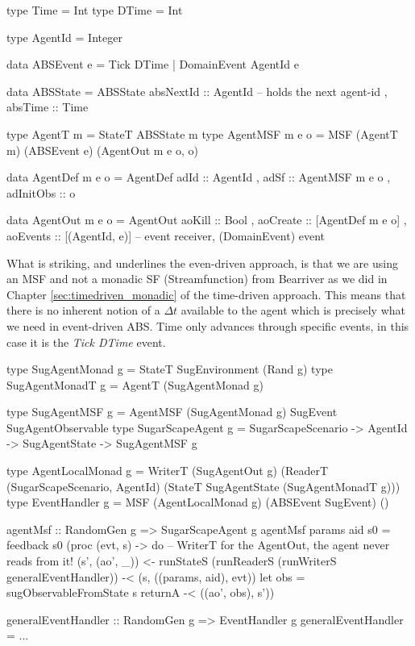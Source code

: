 \begin{HaskellCode}
type Time  = Int
type DTime = Int

type AgentId = Integer

data ABSEvent e = Tick DTime | DomainEvent AgentId e
                
data ABSState = ABSState
  { absNextId :: AgentId -- holds the next agent-id 
  , absTime   :: Time
  }

type AgentT m = StateT ABSState m
type AgentMSF m e o = MSF (AgentT m) (ABSEvent e) (AgentOut m e o, o)

data AgentDef m e o = AgentDef
  { adId      :: AgentId
  , adSf      :: AgentMSF m e o
  , adInitObs :: o
  }

data AgentOut m e o = AgentOut 
  { aoKill   :: Bool
  , aoCreate :: [AgentDef m e o]
  , aoEvents :: [(AgentId, e)]   -- event receiver, (DomainEvent) event
  }
\end{HaskellCode}

What is striking, and underlines the even-driven approach, is that we are using an MSF and not a monadic SF (Streamfunction) from Bearriver as we did in Chapter \ref{sec:timedriven_monadic} of the time-driven approach. This means that there is no inherent notion of a $\Delta t$ available to the agent which is precisely what we need in event-driven ABS. Time only advances through specific events, in this case it is the \textit{Tick DTime} event.

\begin{HaskellCode}
type SugAgentMonad g  = StateT SugEnvironment (Rand g)
type SugAgentMonadT g = AgentT (SugAgentMonad g)

type SugAgentMSF g = AgentMSF (SugAgentMonad g) SugEvent SugAgentObservable
type SugarScapeAgent g = SugarScapeScenario -> AgentId -> SugAgentState -> SugAgentMSF g

type AgentLocalMonad g = WriterT (SugAgentOut g) (ReaderT (SugarScapeScenario, AgentId) (StateT SugAgentState (SugAgentMonadT g)))
type EventHandler g    = MSF (AgentLocalMonad g) (ABSEvent SugEvent) ()

agentMsf :: RandomGen g => SugarScapeAgent g
agentMsf params aid s0 = feedback s0 (proc (evt, s) -> do
  -- WriterT for the AgentOut, the agent never reads from it!
  (s', (ao', _)) <- runStateS (runReaderS (runWriterS generalEventHandler)) -< (s, ((params, aid), evt))
  let obs = sugObservableFromState s
  returnA -< ((ao', obs), s'))
  
generalEventHandler :: RandomGen g => EventHandler g
generalEventHandler = ...
\end{HaskellCode}

